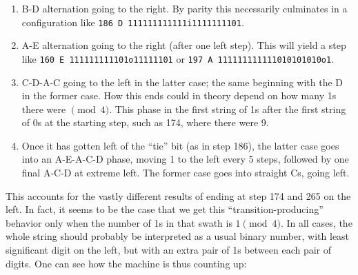 \documentclass[12pt]{article}
\begin{document}
\begin{enumerate}
\item B-D alternation going to the right. By parity this necessarily culminates in a configuration like
\texttt{186 D 111111111111i1111111101}.
\item A-E alternation going to the right (after one left step). This will yield a step like
\texttt{160 E 111111111101o11111101} or \texttt{197 A 111111111111010101010o1}.
\item C-D-A-C going to the left in the latter case; the same beginning with the D in the former case.
How this ends could in theory depend on how many 1s there were $\pmod4$. This phase 
in the first string of 1s after the first string of 0s at the starting step, such as 174, where there were 9.
\item Once it has gotten left of the ``tie'' bit (as in step 186),
the latter case goes into an A-E-A-C-D phase,
moving 1 to the left every 5 steps, followed by one final A-C-D at extreme left.
The former case goes into straight Cs, going left.
\end{enumerate}
This accounts for the vastly different results of ending at step 174 and 265 on the left.
In fact, it seems to be the case that we get this ``transition-producing'' behavior
only when the number of 1s in that swath is $1\pmod4.$
In all cases, the whole string should probably be interpreted as a usual binary number,
with least significant digit on the left, but with an extra pair of 1s between each pair of digits.
One can see how the machine is thus counting up:
\end{document}
